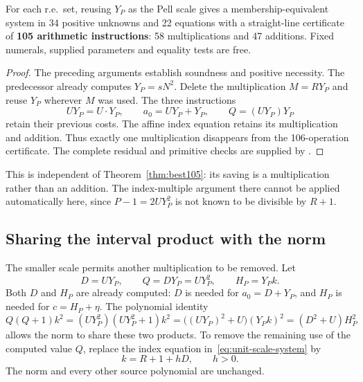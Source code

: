 \begin{theorem}\label{thm:unit-scale105}
For each r.e.\ set, reusing $Y_P$ as the Pell scale gives a
membership-equivalent system in 34 positive unknowns and 22 equations
with a straight-line certificate of \textbf{105 arithmetic instructions}:
58 multiplications and 47 additions. Fixed numerals, supplied parameters
and equality tests are free.
\end{theorem}
\begin{proof}
The preceding arguments establish soundness and positive necessity.
The predecessor already computes $Y_P=sN^2$. Delete the multiplication
$M=RY_P$ and reuse $Y_P$ wherever $M$ was used. The three instructions
\[
 UY_P=U\cdot Y_P,\qquad a_0=UY_P+Y_P,
 \qquad Q=(UY_P)Y_P
\]
retain their previous costs. The affine index equation retains its
multiplication and addition. Thus exactly one multiplication disappears
from the 106-operation certificate. The complete residual and primitive
checks are supplied by
.
\end{proof}

This is independent of Theorem~\ref{thm:best105}: its saving is a
multiplication rather than an addition. The index-multiple argument
there cannot be applied automatically here, since $P-1=2UY_P^2$ is
not known to be divisible by $R+1$.

\subsection{Sharing the interval product with the norm}

The smaller scale permits another multiplication to be removed.
Let
\[
 D=UY_P,\qquad Q=DY_P=UY_P^2,\qquad H_P=Y_Pk.
\]
Both $D$ and $H_P$ are already computed: $D$ is needed for
$a_0=D+Y_P$, and $H_P$ is needed for $c=H_P+\eta$.
The polynomial identity
\begin{equation}\label{eq:shared-pell-norm}
 Q(Q+1)k^2
 =(UY_P^2)(UY_P^2+1)k^2
 =\bigl((UY_P)^2+U\bigr)(Y_Pk)^2
 =(D^2+U)H_P^2
\end{equation}
allows the norm to share these two products.
To remove the remaining use of the computed value $Q$, replace
the index equation in~\eqref{eq:unit-scale-system} by
\begin{equation}\label{eq:shared-pell-index}
 k=R+1+hD,\qquad h>0.
\end{equation}
The norm and every other source polynomial are unchanged.

